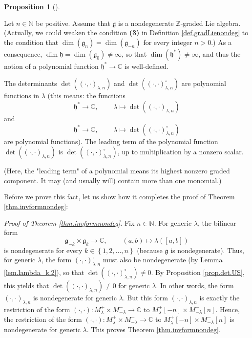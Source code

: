 \documentclass
[numbers=enddot,12pt,final,onecolumn,german,notitlepage]{scrartcl}%
\theoremstyle{definition}
\newtheorem{prop}[theo]{Proposition}
\newenvironment{proposition}[1][]
{\begin{prop}[#1]\begin{leftbar}}
{\end{leftbar}\end{prop}}
\begin{document}
\begin{proposition}
\label{prop.det.US}Let $n\in\mathbb{N}$ be positive. Assume that
$\mathfrak{g}$ is a nondegenerate $\mathbb{Z}$-graded Lie algebra. (Actually,
we could weaken the condition \textbf{(3)} in Definition
\ref{def.gradLienondeg} to the condition that $\dim\left(  \mathfrak{g}%
_{n}\right)  =\dim\left(  \mathfrak{g}_{-n}\right)  $ for every integer
$n>0$.) As a consequence, $\dim\mathfrak{h}=\dim\left(  \mathfrak{g}%
_{0}\right)  \neq\infty$, so that $\dim\left(  \mathfrak{h}^{\ast}\right)
\neq\infty$, and thus the notion of a polynomial function $\mathfrak{h}^{\ast
}\rightarrow\mathbb{C}$ is well-defined.

The determinants $\det\left(  \left(  \cdot,\cdot\right)  _{\lambda,n}\right)
$ and $\det\left(  \left(  \cdot,\cdot\right)  _{\lambda,n}^{\circ}\right)  $
are polynomial functions in $\lambda$ (this means: the functions%
\[
\mathfrak{h}^{\ast}\rightarrow\mathbb{C},\ \ \ \ \ \ \ \ \ \ \lambda
\mapsto\det\left(  \left(  \cdot,\cdot\right)  _{\lambda,n}\right)
\]
and%
\[
\mathfrak{h}^{\ast}\rightarrow\mathbb{C},\ \ \ \ \ \ \ \ \ \ \lambda
\mapsto\det\left(  \left(  \cdot,\cdot\right)  _{\lambda,n}^{\circ}\right)
\]
are polynomial functions). The leading term of the polynomial function
$\det\left(  \left(  \cdot,\cdot\right)  _{\lambda,n}\right)  $ is
$\det\left(  \left(  \cdot,\cdot\right)  _{\lambda,n}^{\circ}\right)  $, up to
multiplication by a nonzero scalar.

(Here, the "leading term" of a polynomial means its highest nonzero graded
component. It may (and usually will) contain more than one monomial.)
\end{proposition}

Before we prove this fact, let us show how it completes the proof of Theorem
\ref{thm.invformnondeg}:

\textit{Proof of Theorem \ref{thm.invformnondeg}.} Fix $n\in\mathbb{N}$. For
generic $\lambda$, the bilinear form%
\[
\mathfrak{g}_{-k}\times\mathfrak{g}_{k}\rightarrow\mathbb{C}%
,\ \ \ \ \ \ \ \ \ \ \left(  a,b\right)  \mapsto\lambda\left(  \left[
a,b\right]  \right)
\]
is nondegenerate for every $k\in\left\{  1,2,...,n\right\}  $ (because
$\mathfrak{g}$ is nondegenerate). Thus, for generic $\lambda$, the form
$\left(  \cdot,\cdot\right)  _{\lambda,n}^{\circ}$ must also be nondegenerate
(by Lemma \ref{lem.lambda_k.2}), so that $\det\left(  \left(  \cdot
,\cdot\right)  _{\lambda,n}^{\circ}\right)  \neq0$. By Proposition
\ref{prop.det.US}, this yields that $\det\left(  \left(  \cdot,\cdot\right)
_{\lambda,n}\right)  \neq0$ for generic $\lambda$. In other words, the form
$\left(  \cdot,\cdot\right)  _{\lambda,n}$ is nondegenerate for generic
$\lambda$. But this form $\left(  \cdot,\cdot\right)  _{\lambda,n}$ is exactly
the restriction of the form $\left(  \cdot,\cdot\right)  :M_{\lambda}%
^{+}\times M_{-\lambda}^{-}\rightarrow\mathbb{C}$ to $M_{\lambda}^{+}\left[
-n\right]  \times M_{-\lambda}^{-}\left[  n\right]  $. Hence, the restriction
of the form $\left(  \cdot,\cdot\right)  :M_{\lambda}^{+}\times M_{-\lambda
}^{-}\rightarrow\mathbb{C}$ to $M_{\lambda}^{+}\left[  -n\right]  \times
M_{-\lambda}^{-}\left[  n\right]  $ is nondegenerate for generic $\lambda$.
This proves Theorem \ref{thm.invformnondeg}.
\end{document}
